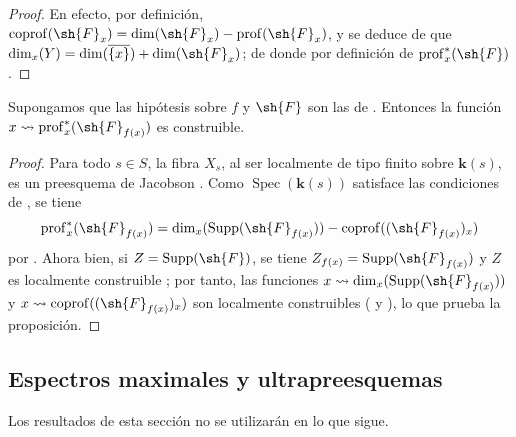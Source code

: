 \begin{proof}
En efecto, por definición, $\operatorname{coprof}(\sh{F}_x)=\dim(\sh{F}_x)-\operatorname{prof}(\sh{F}_x)$, y se deduce de  que $\dim_x(Y)=\dim(\overline{\{x\}})+\dim(\sh{F}_x)$; de donde  por definición de $\operatorname{prof}^*_x(\sh{F})$.
\end{proof}

\begin{corollary}[10.8.8]
\label{IV.10.8.8}
Supongamos que las hipótesis sobre $f$ y $\sh{F}$ son las de . Entonces la función $x\leadsto\operatorname{prof}^*_x(\sh{F}_{f(x)})$ es construible.
\end{corollary}

\begin{proof}
Para todo $s\in S$, la fibra $X_s$, al ser localmente de tipo finito sobre $\boldsymbol k(s)$, es un preesquema de Jacobson . Como $\operatorname{Spec}(\boldsymbol k(s))$ satisface las condiciones de , se tiene
\[
  \operatorname{prof}^*_x(\sh{F}_{f(x)})
  =\dim_x(\operatorname{Supp}(\sh{F}_{f(x)}))
   -\operatorname{coprof}((\sh{F}_{f(x)})_x)
\]
por .
Ahora bien, si $Z=\operatorname{Supp}(\sh{F})$, se tiene $Z_{f(x)}=\operatorname{Supp}(\sh{F}_{f(x)})$  y $Z$ es localmente construible ; por tanto, las funciones $x\leadsto\dim_x(\operatorname{Supp}(\sh{F}_{f(x)}))$ y $x\leadsto\operatorname{coprof}((\sh{F}_{f(x)})_x)$ son localmente construibles ( y ), lo que prueba la proposición.
\end{proof}

\subsection{Espectros maximales y ultrapreesquemas}
\label{subsection:IV.10.9}

Los resultados de esta sección no se utilizarán en lo que sigue.


